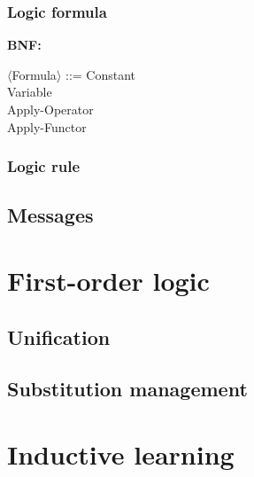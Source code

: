 \documentclass[12pt, a4paper]{report}
\newcommand{\tv}[1]{$\langle${#1}$\rangle$}
\begin{document}
\subsection{Logic formula}

\textbf{BNF:}

\tv{Formula} ::= Constant \|        \\
                 Variable \|        \\
                 Apply-Operator \|  \\
                 Apply-Functor

\subsection{Logic rule}

\section{Messages}




\chapter{First-order logic}

\section{Unification}

\section{Substitution management}

\chapter{Inductive learning}




\clearpage
{}
{}


\end{document}
